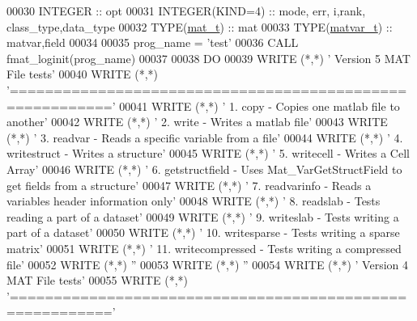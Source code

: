 \begin{DoxyCode}
00030     \textcolor{keywordtype}{INTEGER}                         :: opt
00031     \textcolor{keywordtype}{INTEGER(KIND=4)}                 :: mode, err, i,rank, class\_type,data\_type
00032     \textcolor{keywordtype}{TYPE}(\hyperlink{group___m_a_t_gab0fc888f5a5d79943b16284b1f91c2e8}{mat\_t})                     :: mat
00033     \textcolor{keywordtype}{TYPE}(\hyperlink{group___m_a_t_structmatvar__t}{matvar\_t})                  :: matvar,field
00034 
00035     prog\_name = \textcolor{stringliteral}{'test'}
00036     \textcolor{keyword}{CALL }fmat\_loginit(prog\_name)
00037 
00038     \textcolor{keywordflow}{DO}
00039         \textcolor{keyword}{WRITE} (*,*) \textcolor{stringliteral}{'   Version 5 MAT File tests'}
00040         \textcolor{keyword}{WRITE} (*,*) \textcolor{stringliteral}{'========================================================='}
00041         \textcolor{keyword}{WRITE} (*,*) \textcolor{stringliteral}{' 1.  copy           - Copies one matlab file to another'}
00042         \textcolor{keyword}{WRITE} (*,*) \textcolor{stringliteral}{' 2.  write          - Writes a matlab file'}
00043         \textcolor{keyword}{WRITE} (*,*) \textcolor{stringliteral}{' 3.  readvar        - Reads a specific variable from a file'}
00044         \textcolor{keyword}{WRITE} (*,*) \textcolor{stringliteral}{' 4.  writestruct    - Writes a structure'}
00045         \textcolor{keyword}{WRITE} (*,*) \textcolor{stringliteral}{' 5.  writecell      - Writes a Cell Array'}
00046         \textcolor{keyword}{WRITE} (*,*) \textcolor{stringliteral}{' 6.  getstructfield - Uses Mat\_VarGetStructField to get fields from a structure'}
00047         \textcolor{keyword}{WRITE} (*,*) \textcolor{stringliteral}{' 7.  readvarinfo    - Reads a variables header information only'}
00048         \textcolor{keyword}{WRITE} (*,*) \textcolor{stringliteral}{' 8.  readslab       - Tests reading a part of a dataset'}
00049         \textcolor{keyword}{WRITE} (*,*) \textcolor{stringliteral}{' 9.  writeslab      - Tests writing a part of a dataset'}
00050         \textcolor{keyword}{WRITE} (*,*) \textcolor{stringliteral}{' 10. writesparse    - Tests writing a sparse matrix'}
00051         \textcolor{keyword}{WRITE} (*,*) \textcolor{stringliteral}{' 11. writecompressed - Tests writing a compressed file'}
00052         \textcolor{keyword}{WRITE} (*,*) \textcolor{stringliteral}{''}
00053         \textcolor{keyword}{WRITE} (*,*) \textcolor{stringliteral}{''}
00054         \textcolor{keyword}{WRITE} (*,*) \textcolor{stringliteral}{'   Version 4 MAT File tests'}
00055         \textcolor{keyword}{WRITE} (*,*) \textcolor{stringliteral}{'========================================================='}

\end{DoxyCode}
